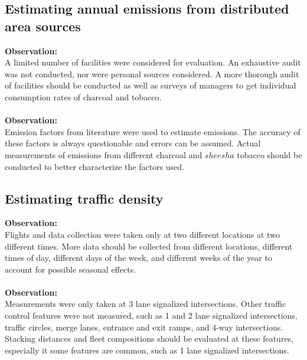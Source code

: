 \subsection*{Estimating annual emissions from distributed area sources}
\noindent
\textbf{Observation:}\\
A limited number of facilities were considered for evaluation. An exhaustive audit was not conducted, nor were personal sources considered. A more thorough audit of facilities should be conducted as well as surveys of managers to get individual consumption rates of charcoal and tobacco. \\
\noindent\\
\textbf{Observation:}\\
Emission factors from literature were used to estimate emissions. The accuracy of these factors is always questionable and errors can be assumed. Actual measurements of emissions from different charcoal and $sheesha$ tobacco should be conducted to better characterize the factors used.\\

\subsection*{Estimating traffic density}
\noindent
\textbf{Observation:}\\
Flights and data collection were taken only at two different locations at two different times. More data should be collected from different locations, different times of day,  different days of the week, and different weeks of the year to account for possible seasonal effects. \\
\noindent\\
\textbf{Observation:}\\
Measurements were only taken at 3 lane signalized intersections. Other traffic control features were not measured, such as 1 and 2 lane signalized intersections, traffic circles, merge lanes, entrance and exit ramps, and 4-way intersections.  Stacking distances and fleet compositions should be evaluated at these features, especially it some features are common, such as 1 lane signalized intersections.
\\

